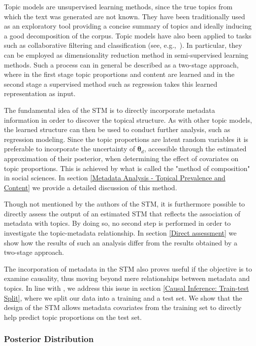 Topic models are unsupervised learning methods, since the true topics from which the text was generated are not known. They have been traditionally used as an exploratory tool providing a concise summary of topics and ideally inducing a good decomposition of the corpus. Topic models have also been applied to tasks such as collaborative filtering and classification (see, e.g.,\ \citealp{blei2003latent}). In particular, they can be employed as dimensionality reduction method in semi-supervised learning methods. Such a process can in general be described as a two-stage approach, where in the first stage topic proportions and content are learned and in the second stage a supervised method such as regression takes this learned representation as input. 

The fundamental idea of the STM is to directly incorporate metadata information in order to discover the topical structure. As with other topic models, the learned structure can then be used to conduct further analysis, such as regression modeling. Since the topic proportions are latent random variables it is preferable to incorporate the uncertainty of $\boldsymbol{\theta}_d$, accessible through the estimated approximation of their posterior, when determining the effect of covariates on topic proportions. This is achieved by what is called the "method of composition" in social sciences. In section \ref{Metadata Analysis - Topical Prevalence and Content} we provide a detailed discussion of this method.

Though not mentioned by the authors of the STM, it is furthermore possible to directly assess the output of an estimated STM that reflects the association of metadata with topics. By doing so, no second step is performed in order to investigate the topic-metadata relationship. In section \ref{Direct assessment} we show how the results of such an analysis differ from the results obtained by a two-stage approach.

The incorporation of metadata in the STM also proves useful if the objective is to examine causality, thus moving beyond mere relationships between metadata and topics. In line with \cite{egami2018make}, we address this issue in section \ref{Causal Inference: Train-test Split}, where we split our data into a training and a test set. We show that the design of the STM allows metadata covariates from the training set to directly help predict topic proportions on the test set.

\subsubsection*{Posterior Distribution}

